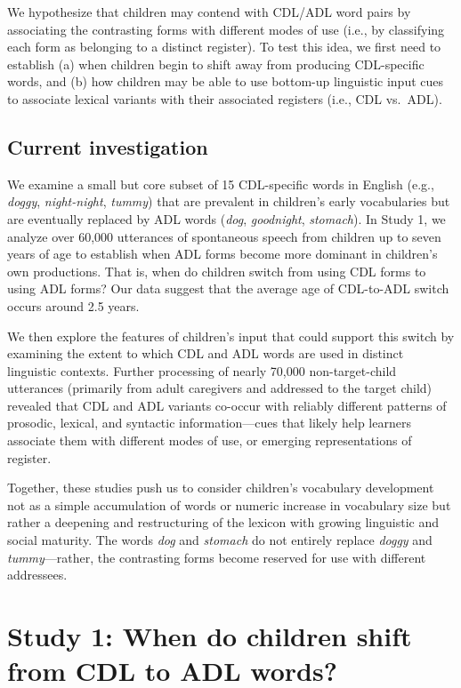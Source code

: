 \documentclass[10pt, letterpaper]{article}
\begin{document}
We hypothesize that children may contend with CDL/ADL word pairs by
associating the contrasting forms with different modes of use (i.e., by
classifying each form as belonging to a distinct register). To test this
idea, we first need to establish (a) when children begin to shift away
from producing CDL-specific words, and (b) how children may be able to
use bottom-up linguistic input cues to associate lexical variants with
their associated registers (i.e., CDL vs.~ADL).

\hypertarget{current-investigation}{%
\subsection{Current investigation}\label{current-investigation}}

We examine a small but core subset of 15 CDL-specific words in English
(e.g., \emph{doggy}, \emph{night-night}, \emph{tummy}) that are
prevalent in children's early vocabularies but are eventually replaced
by ADL words (\emph{dog}, \emph{goodnight}, \emph{stomach}). In Study 1,
we analyze over 60,000 utterances of spontaneous speech from children up
to seven years of age to establish when ADL forms become more dominant
in children's own productions. That is, when do children switch from
using CDL forms to using ADL forms? Our data suggest that the average
age of CDL-to-ADL switch occurs around 2.5 years.

We then explore the features of children's input that could support this
switch by examining the extent to which CDL and ADL words are used in
distinct linguistic contexts. Further processing of nearly 70,000
non-target-child utterances (primarily from adult caregivers and
addressed to the target child) revealed that CDL and ADL variants
co-occur with reliably different patterns of prosodic, lexical, and
syntactic information---cues that likely help learners associate them
with different modes of use, or emerging representations of register.

Together, these studies push us to consider children's vocabulary
development not as a simple accumulation of words or numeric increase in
vocabulary size but rather a deepening and restructuring of the lexicon
with growing linguistic and social maturity. The words \emph{dog} and
\emph{stomach} do not entirely replace \emph{doggy} and
\emph{tummy}---rather, the contrasting forms become reserved for use
with different addressees.

\hypertarget{study-1-when-do-children-shift-from-cdl-to-adl-words}{%
\section{Study 1: When do children shift from CDL to ADL
words?}\label{study-1-when-do-children-shift-from-cdl-to-adl-words}}
\end{document}
